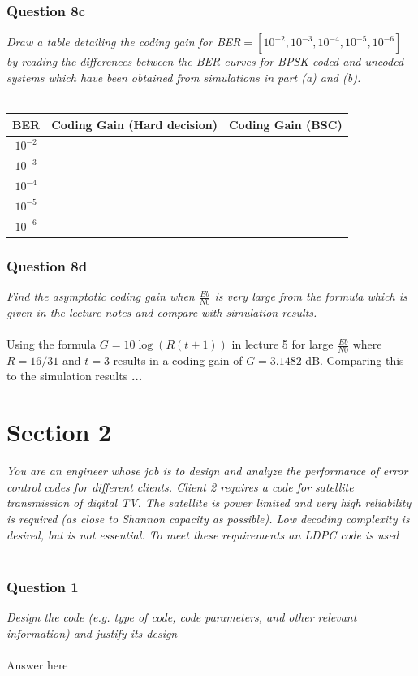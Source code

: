 \documentclass[a4paper]{article}
\begin{document}
\subsubsection*{Question 8c} \textit{Draw a table detailing the coding gain for BER$= [10^{−2}, 10^{−3}, 10^{−4} , 10^{−5} , 10^{−6} ]$ by reading the differences between the BER curves for BPSK coded and uncoded systems which have been obtained from simulations in part (a) and (b).} \\
\\
\begin{tabular}{| c | c | c |}
\hline
BER & Coding Gain (Hard decision) & Coding Gain (BSC) \\
\hline
$10^{-2}$ & & \\
\hline
$10^{-3}$ & & \\
\hline
$10^{-4}$ & & \\
\hline
$10^{-5}$ & & \\
\hline
$10^{-6}$ & & \\
\hline
\end{tabular}

\subsubsection*{Question 8d} \textit{Find the asymptotic coding gain when $\frac{Eb}{N0}$ is very large from the formula which is given in the lecture notes and compare with simulation results.} \\
\\
Using the formula $G = 10\log(R(t+1))$ in lecture 5 for large $\frac{Eb}{N0}$ where $R = 16/31$ and $t = 3$ results in a coding gain of $G = 3.1482$ dB. Comparing this to the simulation results \textbf{...} \\

\section*{Section 2}

\textit{You are an engineer whose job is to design and analyze the performance of error control codes for different clients. Client 2 requires a code for satellite transmission of digital TV. The satellite is power limited and very high reliability is required (as close to Shannon capacity as possible). Low decoding complexity is desired, but is not essential. To meet these requirements an LDPC code is used} \\
\\
\subsubsection*{Question 1} \textit{Design the code (e.g. type of code, code parameters, and other relevant information) and justify its design}\\
\\
Answer here \\
\end{document}
